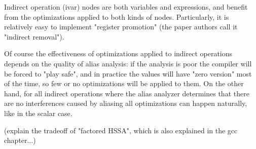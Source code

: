Indirect operation (ivar) nodes are both variables and expressions, and benefit from the optimizations applied to both kinds of nodes. Particularly, it is relatively easy to implement "register promotion" (the paper authors call it "indirect removal").

Of course the effectiveness of optimizations applied to indirect operations depends on the quality of alias analysis: if the analysis is poor the compiler will be forced to "play safe", and in practice the values will have "zero version" most of the time, so few or no optimizations will be applied to them.
On the other hand, for all indirect operations where the alias analyzer determines that there are no interferences caused by aliasing all optimizations can happen naturally, like in the scalar case.

(explain the tradeoff of "factored HSSA", which is also explained in the gcc chapter...)



